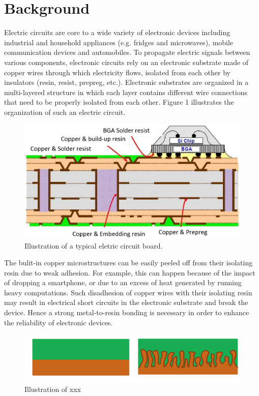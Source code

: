 \documentclass[10pt,twocolumn,letterpaper]{article}
\begin{document}
\section{Background}

Electric circuits are core to a wide variety of electronic devices including industrial and household appliances (e.g. fridges and microwaves), mobile communication devices and automobiles.
To propagate electric signals between various components, electronic circuits rely on an electronic substrate  made of copper wires through which electricity flows, isolated from each other by insulators (resin, resist, prepreg, etc.).
Electronic substrates are organized in a multi-layered structure in which each layer contains different wire connections that need to be properly isolated from each other. Figure 1 illustrates the organization of such an electric circuit.

\begin{figure}[h]
\centering
\includegraphics[width=0.9\linewidth]{"./figures/Figure1"}
\caption{
Illustration of a typical eletric circuit board.
}
\end{figure}


The bulit-in copper microstructures can be easily peeled off from their isolating resin due to weak adhesion. For example, this can happen because of the impact of dropping a smartphone, or due to an excess of heat generated by running heavy computations.
Such disadhesion of copper wires with their isolating resin may result in electrical short circuits in the electronic substrate and break the device.
Hence a strong metal-to-resin bonding is necessary in order to enhance the reliability of electronic devices.

\begin{figure}[h]
	\centering
	\includegraphics[width=0.9\linewidth]{"./figures/Figure2"}
	\caption{
		Illustration of xxx
	}
\end{figure}
\end{document}
